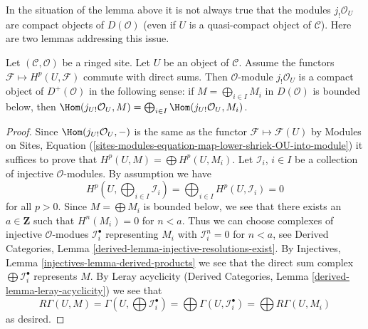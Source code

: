 \noindent
In the situation of the lemma above it is not always true that the
modules $j_!\mathcal{O}_U$ are compact objects of $D(\mathcal{O})$
(even if $U$ is a quasi-compact object of $\mathcal{C}$).
Here are two lemmas addressing this issue.


\begin{lemma}
\label{lemma-when-jshriek-lower-compact}
Let $(\mathcal{C}, \mathcal{O})$ be a ringed site. Let $U$ be an object of
$\mathcal{C}$. Assume the functors $\mathcal{F} \mapsto H^p(U, \mathcal{F})$
commute with direct sums. Then $\mathcal{O}$-module $j_!\mathcal{O}_U$ is a
compact object of $D^+(\mathcal{O})$ in the following sense:
if $M = \bigoplus_{i \in I} M_i$ in $D(\mathcal{O})$ is
bounded below, then $\Hom(j_{U!}\mathcal{O}_U, M) =
\bigoplus_{i \in I} \Hom(j_{U!}\mathcal{O}_U, M_i)$.
\end{lemma}

\begin{proof}
Since $\Hom(j_{U!}\mathcal{O}_U, -)$ is the same as the functor
$\mathcal{F} \mapsto \mathcal{F}(U)$ by
Modules on Sites, Equation
(\ref{sites-modules-equation-map-lower-shriek-OU-into-module}) it suffices
to prove that $H^p(U, M) = \bigoplus H^p(U, M_i)$.
Let $\mathcal{I}_i$, $i \in I$ be a collection of injective
$\mathcal{O}$-modules. By assumption we have
$$
H^p(U, \bigoplus\nolimits_{i \in I} \mathcal{I}_i) =
\bigoplus\nolimits_{i \in I} H^p(U, \mathcal{I}_i) = 0
$$
for all $p > 0$. Since $M = \bigoplus M_i$ is bounded below, we
see that there exists an $a \in \mathbf{Z}$ such that $H^n(M_i) = 0$
for $n < a$. Thus we can choose complexes of injective $\mathcal{O}$-modues
$\mathcal{I}_i^\bullet$ representing $M_i$
with $\mathcal{I}_i^n = 0$ for $n < a$, see
Derived Categories, Lemma \ref{derived-lemma-injective-resolutions-exist}.
By Injectives, Lemma \ref{injectives-lemma-derived-products}
we see that the direct sum complex $\bigoplus \mathcal{I}_i^\bullet$
represents $M$. By Leray acyclicity
(Derived Categories, Lemma \ref{derived-lemma-leray-acyclicity})
we see that
$$
R\Gamma(U, M) = \Gamma(U, \bigoplus \mathcal{I}_i^\bullet) =
\bigoplus \Gamma(U, \mathcal{I}_i^\bullet) =
\bigoplus R\Gamma(U, M_i)
$$
as desired.
\end{proof}

